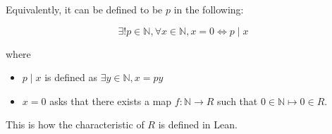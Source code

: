 \begin{remark}
    \label{mk:characteristic}

    Equivalently, it can be defined to be $p$ in the following:

    $$
    \exists! p \in \mathbb{N}, \forall x \in \mathbb{N}, x = 0 \iff p \mid x
    $$

    where
    
    \begin{itemize}

        \item $p \mid x$ is defined as $\exists y \in \mathbb{N}, x = p y$
    
        \item $x = 0$ asks that there exists a map $f : \mathbb{N} \to R$ such that $0 \in \mathbb{N} ↦ 0 \in R$.
        
    \end{itemize}

    This is how the characteristic of $R$ is defined in Lean.

\end{remark}